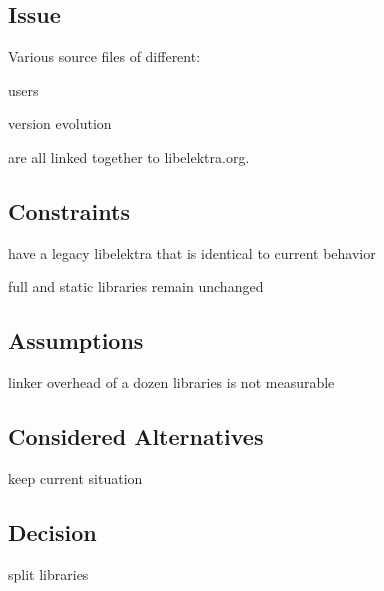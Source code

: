 \subsection*{Issue}

Various source files of different\+:


\begin{DoxyItemize}
\item users
\item version evolution
\end{DoxyItemize}

are all linked together to libelektra.\+org.

\subsection*{Constraints}


\begin{DoxyItemize}
\item have a legacy libelektra that is identical to current behavior
\item full and static libraries remain unchanged
\end{DoxyItemize}

\subsection*{Assumptions}


\begin{DoxyItemize}
\item linker overhead of a dozen libraries is not measurable
\end{DoxyItemize}

\subsection*{Considered Alternatives}


\begin{DoxyItemize}
\item keep current situation
\end{DoxyItemize}

\subsection*{Decision}


\begin{DoxyItemize}
\item split libraries
\end{DoxyItemize}

